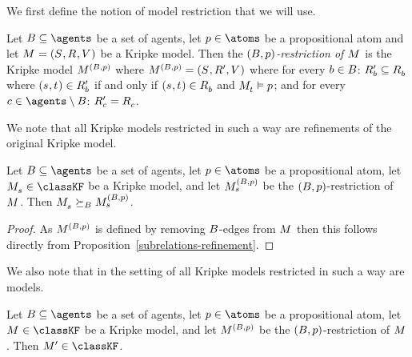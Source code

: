 We first define the notion of model restriction that we will use.

\begin{definition}
Let $\agentsB \subseteq \agents$ be a set of agents, let $\atomP \in \atoms$ be a propositional atom and let $\kModelAndTuple$ be a Kripke model.
Then the {\em $(\agentsB, \atomP)$-restriction of $\kModel$} is the Kripke model $\kModel[(\agentsB, \atomP)]$ where $\kModel[(\agentsB, \atomP)] = (\kStates, \kAccessibilityP{}, \kValuation)$ where for every $\agentB \in \agentsB$: $\kAccessibilityPB \subseteq \kAccessibilityB$ where $(\kStateS, \kStateT) \in \kAccessibilityPB$ if and only if $(\kStateS, \kStateT) \in \kAccessibilityB$ and $\kPModel{\kStateT} \entails \atomP$; and for every $\agentC \in \agents \setminus \agentsB$: $\kAccessibilityPC = \kAccessibilityC$.
\end{definition}

We note that all Kripke models restricted in such a way are refinements of the original Kripke model.

\begin{lemma}\label{rml-k4-restriction-refinement}
Let $\agentsB \subseteq \agents$ be a set of agents, let $\atomP \in \atoms$ be a propositional atom, let $\kPModel{\kStateS} \in \classKF$ be a Kripke model, and let $\kPModel[(\agentsB, \atomP)]{\kStateS}$ be the $(\agentsB, \atomP)$-restriction of $\kModel$.
Then $\kPModel{\kStateS} \simulatesBs \kPModel[(\agentsB, \atomP)]{\kStateS}$.
\end{lemma}

\begin{proof}
As $\kModel[(\agentsB, \atomP)]$ is defined by removing $\agentsB$-edges from $\kModel$ then this follows directly from Proposition~\ref{subrelations-refinement}.
\end{proof}

We also note that in the setting of \classKF{} all Kripke models restricted in such a way are \classKF{} models.

\begin{lemma}\label{rml-k4-restriction-k4}
Let $\agentsB \subseteq \agents$ be a set of agents, let $\atomP \in \atoms$ be a propositional atom, let $\kModel \in \classKF$ be a Kripke model, and let $\kModel[(\agentsB, \atomP)]$ be the $(\agentsB, \atomP)$-restriction of $\kModel$.
Then $\kModelP \in \classKF$.
\end{lemma}

